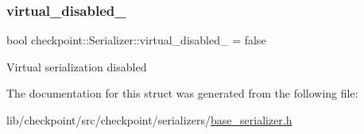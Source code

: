 \subsubsection{\texorpdfstring{virtual\+\_\+disabled\+\_\+}{virtual\_disabled\_}}
{\footnotesize\ttfamily bool checkpoint\+::\+Serializer\+::virtual\+\_\+disabled\+\_\+ = false\hspace{0.3cm}{\ttfamily [protected]}}

Virtual serialization disabled 

The documentation for this struct was generated from the following file\+:\begin{DoxyCompactItemize}
\item 
lib/checkpoint/src/checkpoint/serializers/\hyperlink{base__serializer_8h}{base\+\_\+serializer.\+h}\end{DoxyCompactItemize}
